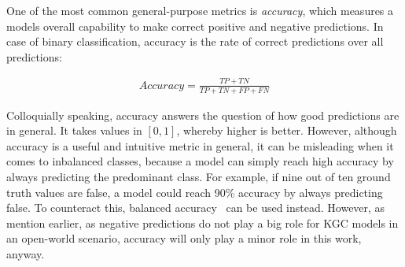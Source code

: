 One of the most common general-purpose metrics is \emph{accuracy}, which measures a models overall capability to make correct positive and negative predictions. In case of binary classification, accuracy is the rate of correct predictions over all predictions:

\begin{align}
    Accuracy = \frac{TP + TN}{TP + TN + FP + FN}
    \label{eq:2_basics/2_metrics/1_accuracy/accuracy}
\end{align}

Colloquially speaking, accuracy answers the question of how good predictions are in general. It takes values in $[0, 1]$, whereby higher is better. However, although accuracy is a useful and intuitive metric in general, it can be misleading when it comes to inbalanced classes, because a model can simply reach high accuracy by always predicting the predominant class. For example, if nine out of ten ground truth values are false, a model could reach 90\% accuracy by always predicting false. To counteract this, balanced accuracy~\cite{Mower2005PREPMtPR} can be used instead. However, as mention earlier, as negative predictions do not play a big role for KGC models in an open-world scenario, accuracy will only play a minor role in this work, anyway.
